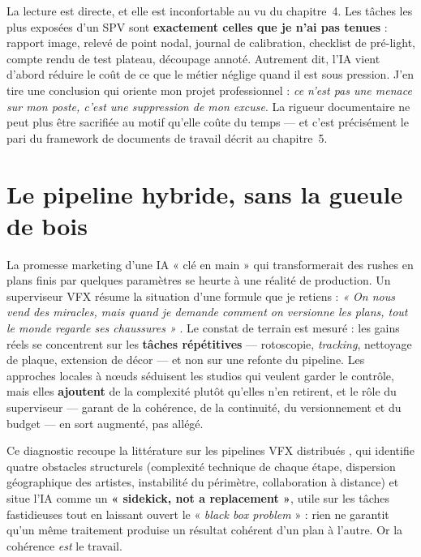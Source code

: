 \documentclass[11pt,a4paper]{report}
\begin{document}
\begin{infobox}[title={Ce que cela signifie très concrètement pour un superviseur de production virtuelle}]
La lecture est directe, et elle est inconfortable au vu du chapitre~4. Les tâches les plus exposées
d'un SPV sont \textbf{exactement celles que je n'ai pas tenues} : rapport image, relevé de point
nodal, journal de calibration, checklist de pré-light, compte rendu de test plateau, découpage
annoté. Autrement dit, l'IA vient d'abord réduire le coût de ce que le métier néglige quand il est
sous pression. J'en tire une conclusion qui oriente mon projet professionnel : \emph{ce n'est pas
une menace sur mon poste, c'est une suppression de mon excuse}. La rigueur documentaire ne
peut plus être sacrifiée au motif qu'elle coûte du temps --- et c'est précisément le pari du
framework de documents de travail décrit au chapitre~5.
\end{infobox}

\section{Le pipeline hybride, sans la gueule de bois}
La promesse marketing d'une IA « clé en main » qui transformerait des rushes en plans finis par
quelques paramètres se heurte à une réalité de production. Un superviseur VFX résume la
situation d'une formule que je retiens : \emph{« On nous vend des miracles, mais quand je
demande comment on versionne les plans, tout le monde regarde ses chaussures »}
\autocite{ktt_supervfx2026}. Le constat de terrain est mesuré : les gains réels se concentrent sur
les \textbf{tâches répétitives} --- rotoscopie, \emph{tracking}, nettoyage de plaque, extension de
décor --- et non sur une refonte du pipeline. Les approches locales à n\oe uds séduisent les studios
qui veulent garder le contrôle, mais elles \textbf{ajoutent} de la complexité plutôt qu'elles n'en
retirent, et le rôle du superviseur --- garant de la cohérence, de la continuité, du versionnement
et du budget --- en sort augmenté, pas allégé.

Ce diagnostic recoupe la littérature sur les pipelines VFX distribués \autocite{lucidlink2026},
qui identifie quatre obstacles structurels (complexité technique de chaque étape, dispersion
géographique des artistes, instabilité du périmètre, collaboration à distance) et situe l'IA comme
un \textbf{« sidekick, not a replacement »}, utile sur les tâches fastidieuses tout en laissant
ouvert le « \emph{black box problem} » : rien ne garantit qu'un même traitement produise un
résultat cohérent d'un plan à l'autre. Or la cohérence \emph{est} le travail.
\end{document}
